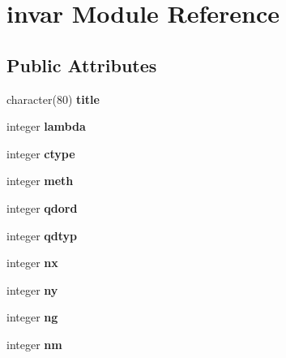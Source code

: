 \hypertarget{classinvar}{\section{invar Module Reference}
\label{classinvar}
}
\subsection*{Public Attributes}
\begin{DoxyCompactItemize}
\item 
\hypertarget{classinvar_a02e121bc3c9d12618d1032db99cdec28}{character(80) {\bfseries title}}\label{classinvar_a02e121bc3c9d12618d1032db99cdec28}

\item 
\hypertarget{classinvar_a46bce44e6d673a4cc6e882ce30b1840a}{integer {\bfseries lambda}}\label{classinvar_a46bce44e6d673a4cc6e882ce30b1840a}

\item 
\hypertarget{classinvar_a481d2438b1f2df33a3cd5678af058017}{integer {\bfseries ctype}}\label{classinvar_a481d2438b1f2df33a3cd5678af058017}

\item 
\hypertarget{classinvar_aa0cf3a9d0200fd8688e2b2ec77f9956f}{integer {\bfseries meth}}\label{classinvar_aa0cf3a9d0200fd8688e2b2ec77f9956f}

\item 
\hypertarget{classinvar_a76180eb349e29c35acde311053573cde}{integer {\bfseries qdord}}\label{classinvar_a76180eb349e29c35acde311053573cde}

\item 
\hypertarget{classinvar_a9df7842f50924b762f68f20654b9b68c}{integer {\bfseries qdtyp}}\label{classinvar_a9df7842f50924b762f68f20654b9b68c}

\item 
\hypertarget{classinvar_a7926819499637fd377c0fbcc8d2ce390}{integer {\bfseries nx}}\label{classinvar_a7926819499637fd377c0fbcc8d2ce390}

\item 
\hypertarget{classinvar_a56faa93c6707a7e5b0fba189e3f7d19f}{integer {\bfseries ny}}\label{classinvar_a56faa93c6707a7e5b0fba189e3f7d19f}

\item 
\hypertarget{classinvar_a2c36e6e26f736a59f283704bd4998821}{integer {\bfseries ng}}\label{classinvar_a2c36e6e26f736a59f283704bd4998821}

\item 
\hypertarget{classinvar_ad46509578bfab6a49094b99282d36bf6}{integer {\bfseries nm}}\label{classinvar_ad46509578bfab6a49094b99282d36bf6}


\end{DoxyCompactItemize}
